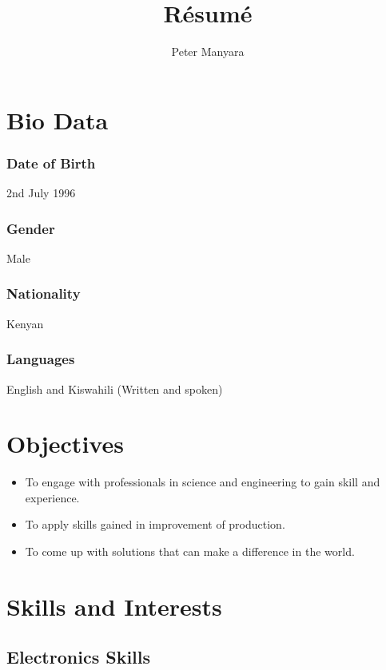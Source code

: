 \documentclass[a4paper]{article}
\title{R\'esum\'e}
\author{Peter Manyara}
\begin{document}
\maketitle
\section{Bio Data}

\subsubsection{Date of Birth}
2nd July 1996
\subsubsection{Gender}
Male
\subsubsection{Nationality}
Kenyan
\subsubsection{Languages}
English and Kiswahili (Written and spoken)

\section{Objectives}
\begin{itemize}
	\item To engage with professionals in science and engineering to gain skill and experience.
	\item To apply skills gained in improvement of production.
	\item To come up with solutions that can make a difference in the world. 
\end{itemize}

\section{Skills and Interests}
\subsection{Electronics Skills}
\end{document}
